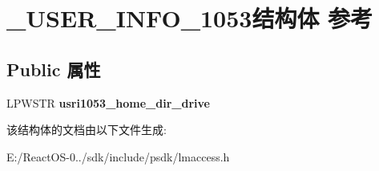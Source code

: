 \hypertarget{struct___u_s_e_r___i_n_f_o__1053}{}\section{\+\_\+\+U\+S\+E\+R\+\_\+\+I\+N\+F\+O\+\_\+1053结构体 参考}
\label{struct___u_s_e_r___i_n_f_o__1053}
\subsection*{Public 属性}
\begin{DoxyCompactItemize}
\item 
\mbox{\label{struct___u_s_e_r___i_n_f_o__1053_ac972aa5d66cb31f438aa8f8356bb1c04}} 
L\+P\+W\+S\+TR {\bfseries usri1053\+\_\+home\+\_\+dir\+\_\+drive}
\end{DoxyCompactItemize}


该结构体的文档由以下文件生成\+:\begin{DoxyCompactItemize}
\item 
E\+:/\+React\+O\+S-\/0../sdk/include/psdk/lmaccess.\+h\end{DoxyCompactItemize}
